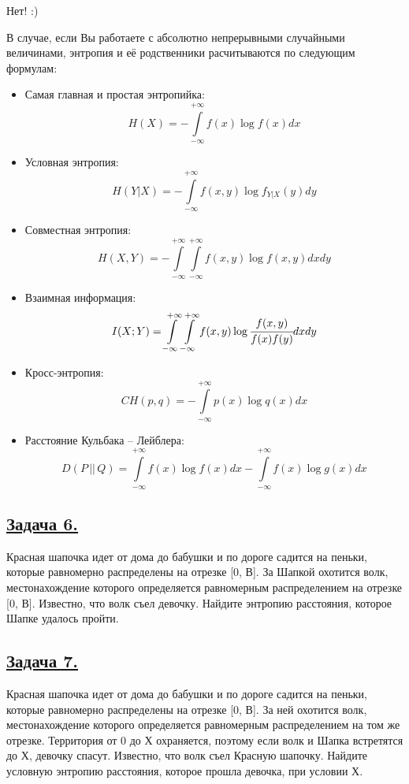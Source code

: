 Нет! :)

В случае, если Вы работаете с абсолютно непрерывными случайными величинами, энтропия и её родственники расчитываются по следующим формулам:
\begin{itemize}
    \item Самая главная и простая энтропийка:
    \[H(X)=-\int\limits_{-\infty}^{+\infty} f(x)\log f(x)dx \]
    \item Условная энтропия:
    \[H(Y|X)=-\int\limits_{-\infty}^{+\infty} f(x, y)\log f_{Y|X}(y)dy \]
    \item Совместная энтропия:
    \[H(X, Y)=-\int\limits_{-\infty}^{+\infty} \int\limits_{-\infty}^{+\infty} f(x, y)\log f(x, y)dxdy \]
    \item Взаимная информация:
    \[I(X; Y)=\int\limits_{-\infty}^{+\infty} \int\limits_{-\infty}^{+\infty} f(x, y) \log \cfrac{f(x, y)}{f(x)f(y)}dxdy \]
    \item Кросс-энтропия:
    \[CH(p, q)=-\int\limits_{-\infty}^{+\infty}p(x)\log q(x) dx \]
    \item Расстояние Кульбака -- Лейблера:
    \[D(P\, ||\, Q)=\int\limits_{-\infty}^{+\infty} f(x)\log f(x)dx -\int\limits_{-\infty}^{+\infty} f(x)\log g(x)dx  \]
\end{itemize}

\subsection*{\hyperref[sec:sol_problem6]{Задача 6.}}\label{sec:problem6} Красная шапочка идет от дома до бабушки и по дороге садится на пеньки, которые равномерно распределены на отрезке [0, В]. За Шапкой охотится волк, местонахождение которого определяется равномерным распределением на отрезке [0, В]. Известно, что волк съел девочку. Найдите энтропию расстояния, которое Шапке удалось пройти. 

\subsection*{\hyperref[sec:sol_problem7]{Задача 7.}}\label{sec:problem7} Красная шапочка идет от дома до бабушки и по дороге садится на пеньки, которые равномерно распределены на отрезке [0, В]. За ней охотится волк, местонахождение которого определяется равномерным распределением на том же отрезке. Территория от 0 до Х охраняется, поэтому если волк и Шапка встретятся до Х, девочку спасут. Известно, что волк съел Красную шапочку. Найдите условную энтропию расстояния, которое прошла девочка, при условии Х.

